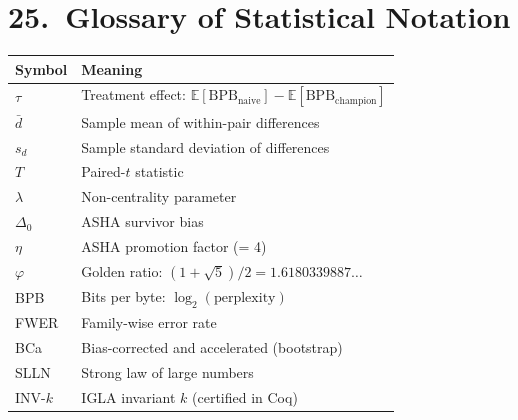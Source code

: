 \section{25.\ Glossary of Statistical Notation}\label{sec:ch26-glossary}

\begin{longtable}[]{@{}ll@{}}
\toprule\noalign{}
Symbol & Meaning \\
\midrule\noalign{}
\endhead
\bottomrule\noalign{}
\endlastfoot
\(\tau\) & Treatment effect: \(\mathbb{E}[\mathrm{BPB}_{\mathrm{naive}}] - \mathbb{E}[\mathrm{BPB}_{\mathrm{champion}}]\) \\
\(\bar{d}\) & Sample mean of within-pair differences \\
\(s_d\) & Sample standard deviation of differences \\
\(T\) & Paired-\(t\) statistic \\
\(\lambda\) & Non-centrality parameter \\
\(\Delta_0\) & ASHA survivor bias \\
\(\eta\) & ASHA promotion factor (= 4) \\
\(\varphi\) & Golden ratio: \((1+\sqrt{5})/2 = 1.6180339887\ldots\) \\
BPB & Bits per byte: \(\log_2(\mathrm{perplexity})\) \\
FWER & Family-wise error rate \\
BCa & Bias-corrected and accelerated (bootstrap) \\
SLLN & Strong law of large numbers \\
INV-\(k\) & IGLA invariant \(k\) (certified in Coq) \\
\end{longtable}

